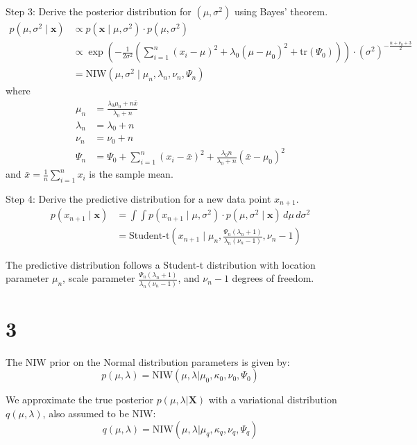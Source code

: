 \documentclass[11pt]{article}
\begin{document}
    Step 3: Derive the posterior distribution for $(\mu, \sigma^2)$ using Bayes' theorem.
    \begin{align*}
        p(\mu, \sigma^2 \mid \mathbf{x}) &\propto p(\mathbf{x} \mid \mu, \sigma^2) \cdot p(\mu, \sigma^2) \\
        &\propto \exp\left(-\frac{1}{2\sigma^2} \left(\sum_{i=1}^n (x_i - \mu)^2 + \lambda_0(\mu - \mu_0)^2 + \text{tr}(\Psi_0)\right)\right) \cdot (\sigma^2)^{-\frac{n+\nu_0+3}{2}} \\
        &= \text{NIW}(\mu, \sigma^2 \mid \mu_n, \lambda_n, \nu_n, \Psi_n)
    \end{align*}
    where
    \begin{align*}
        \mu_n &= \frac{\lambda_0\mu_0 + n\bar{x}}{\lambda_0 + n} \\
        \lambda_n &= \lambda_0 + n \\
        \nu_n &= \nu_0 + n \\
        \Psi_n &= \Psi_0 + \sum_{i=1}^n (x_i - \bar{x})^2 + \frac{\lambda_0n}{\lambda_0+n}(\bar{x} - \mu_0)^2
    \end{align*}
    and $\bar{x} = \frac{1}{n}\sum_{i=1}^n x_i$ is the sample mean.

    Step 4: Derive the predictive distribution for a new data point $x_{n+1}$.
    \begin{align*}
        p(x_{n+1} \mid \mathbf{x}) &= \int\int p(x_{n+1} \mid \mu, \sigma^2) \cdot p(\mu, \sigma^2 \mid \mathbf{x}) \, d\mu \, d\sigma^2 \\
        &= \text{Student-t}(x_{n+1} \mid \mu_n, \frac{\Psi_n(\lambda_n+1)}{\lambda_n(\nu_n-1)}, \nu_n-1)
    \end{align*}

    The predictive distribution follows a Student-t distribution with location parameter $\mu_n$, scale parameter $\frac{\Psi_n(\lambda_n+1)}{\lambda_n(\nu_n-1)}$, and $\nu_n-1$ degrees of freedom.


    \section{3}
    The NIW prior on the Normal distribution parameters is given by:
    $$
    p(\mu, \lambda) = \text{NIW}(\mu, \lambda | \mu_0, \kappa_0, \nu_0, \Psi_0)
    $$

    We approximate the true posterior $p(\mu, \lambda | \mathbf{X})$ with a variational distribution $q(\mu, \lambda)$, also assumed to be NIW:
    $$
    q(\mu, \lambda) = \text{NIW}(\mu, \lambda | \mu_q, \kappa_q, \nu_q, \Psi_q)
    $$
\end{document}
